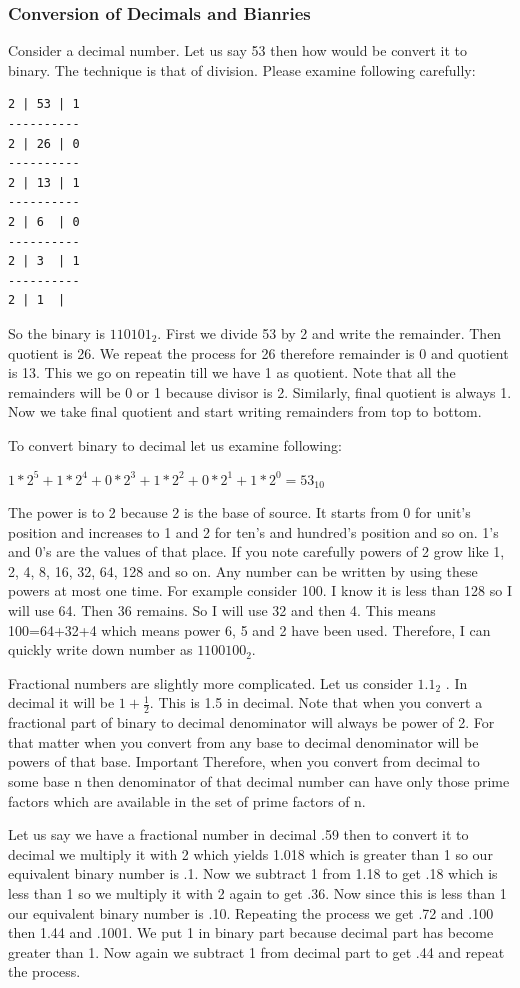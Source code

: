 \subsubsection{Conversion of Decimals and Bianries}
Consider a decimal number. Let us say 53 then how would be convert it to
binary. The technique is that of division. Please examine following carefully:

\hspace*{2cm}
\begin{verbatim}
2 | 53 | 1
----------
2 | 26 | 0
----------
2 | 13 | 1
----------
2 | 6  | 0
----------
2 | 3  | 1
----------
2 | 1  |
\end{verbatim}

So the binary is $110101_2$. First we divide 53 by 2 and write the
remainder. Then quotient is 26. We repeat the process for 26 therefore
remainder is 0 and quotient is 13. This we go on repeatin till we have 1 as
quotient. Note that all the remainders will be 0 or 1 because divisor is
2. Similarly, final quotient is always 1. Now we take final quotient and start
writing remainders from top to bottom.

To convert binary to decimal let us examine following:

$1*2^5 +1*2^4 +0*2^3 +1*2^2 +0*2^1 +1*2^0 =53_{10}$

The power is to 2 because 2 is the base of source. It starts from 0 for unit's
position and increases to 1 and 2 for ten's and hundred's position and so
on. 1's and 0's are the values of that place. If you note carefully powers of 2
grow like 1, 2, 4, 8, 16, 32, 64, 128 and so on. Any number can be written by
using these powers at most one time. For example consider 100. I know it is
less than 128 so I will use 64. Then 36 remains. So I will use 32 and then
4. This means 100=64+32+4  which means power 6, 5 and 2 have been
used. Therefore, I can quickly write down number as $1100100_2$.

Fractional numbers are slightly more complicated. Let us consider $1.1_2$  . In
decimal it will be $1+\frac{1}{2}$. This is 1.5 in decimal. Note that when you
convert a fractional part of binary to decimal denominator will always be power
of 2. For that matter when you convert from any base to decimal denominator
will be powers of that base. Important Therefore, when you convert from decimal
to some base n then denominator of that decimal number can have only those
prime factors which are available in the set of prime factors of n. 

Let us say we have a fractional number in decimal .59 then to convert it to
decimal we multiply it with 2 which yields 1.018 which is greater than 1 so our
equivalent binary number is .1. Now we subtract 1 from 1.18 to get .18 which
is less than 1 so we multiply it with 2 again to get .36. Now since this is
less than 1 our equivalent binary number is .10. Repeating the process we get
.72 and .100 then 1.44 and .1001. We put 1 in binary part because decimal part
has become greater than 1. Now again we subtract 1 from decimal part to get .44
and repeat the process.

